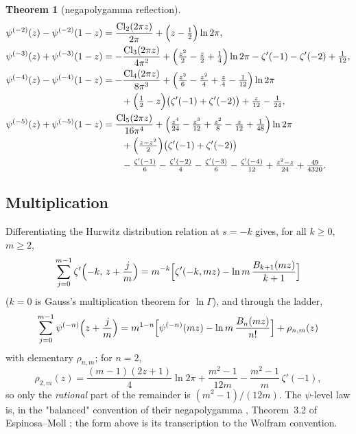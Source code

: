 \documentclass[11pt]{article}
\newtheorem{theorem}{Theorem}[section]
\theoremstyle{remark}
\begin{document}
\begin{theorem}[negapolygamma reflection]\label{thm:psirefl}
\begin{align*}
\psi^{(-2)}(z)-\psi^{(-2)}(1-z)
&=\frac{\operatorname{Cl}_2(2\pi z)}{2\pi}
+\Bigl(z-\tfrac12\Bigr)\ln2\pi,\\
\psi^{(-3)}(z)+\psi^{(-3)}(1-z)
&=-\frac{\operatorname{Cl}_3(2\pi z)}{4\pi^2}
+\Bigl(\tfrac{z^2}{2}-\tfrac{z}{2}+\tfrac14\Bigr)\ln2\pi
-\zeta'(-1)-\zeta'(-2)+\tfrac1{12},\\
\psi^{(-4)}(z)-\psi^{(-4)}(1-z)
&=-\frac{\operatorname{Cl}_4(2\pi z)}{8\pi^3}
+\Bigl(\tfrac{z^3}{6}-\tfrac{z^2}{4}+\tfrac{z}{4}-\tfrac1{12}\Bigr)\ln2\pi\\
&\qquad+\Bigl(\tfrac12-z\Bigr)\bigl(\zeta'(-1)+\zeta'(-2)\bigr)
+\tfrac{z}{12}-\tfrac1{24},\\
\psi^{(-5)}(z)+\psi^{(-5)}(1-z)
&=\frac{\operatorname{Cl}_5(2\pi z)}{16\pi^4}
+\Bigl(\tfrac{z^4}{24}-\tfrac{z^3}{12}+\tfrac{z^2}{8}-\tfrac{z}{12}
+\tfrac1{48}\Bigr)\ln2\pi\\
&\qquad+\Bigl(\tfrac{z-z^2}{2}\Bigr)\bigl(\zeta'(-1)+\zeta'(-2)\bigr)\\
&\qquad-\tfrac{\zeta'(-1)}{6}-\tfrac{\zeta'(-2)}{4}-\tfrac{\zeta'(-3)}{6}
-\tfrac{\zeta'(-4)}{12}
+\tfrac{z^2-z}{24}+\tfrac{49}{4320}.
\end{align*}
\end{theorem}

\subsection{Multiplication}

Differentiating the Hurwitz distribution relation at $s=-k$ gives, for all
$k\ge0$, $m\ge2$,
\begin{equation}\label{eq:negmult}
\sum_{j=0}^{m-1}\zeta'\Bigl(-k,\,z+\frac jm\Bigr)
=m^{-k}\Bigl[\zeta'(-k,mz)-\ln m\,\frac{B_{k+1}(mz)}{k+1}\Bigr]
\end{equation}
($k=0$ is Gauss's multiplication theorem for $\ln\Gamma$), and through the
ladder,
\[
\sum_{j=0}^{m-1}\psi^{(-n)}\Bigl(z+\frac jm\Bigr)
=m^{1-n}\Bigl[\psi^{(-n)}(mz)-\ln m\,\frac{B_n(mz)}{n!}\Bigr]
+\rho_{n,m}(z)
\]
with elementary $\rho_{n,m}$; for $n=2$,
\[
\rho_{2,m}(z)=\frac{(m-1)(2z+1)}4\ln2\pi+\frac{m^2-1}{12m}
-\frac{m^2-1}{m}\,\zeta'(-1),
\]
so only the \emph{rational} part of the remainder is $(m^2-1)/(12m)$. The
$\psi$-level law is, in the "balanced" convention of their negapolygamma
\cite{EspinosaMoll2}, Theorem~3.2 of Espinosa--Moll \cite{EspinosaMoll04};
the form above is its transcription to the Wolfram convention.
\end{document}
